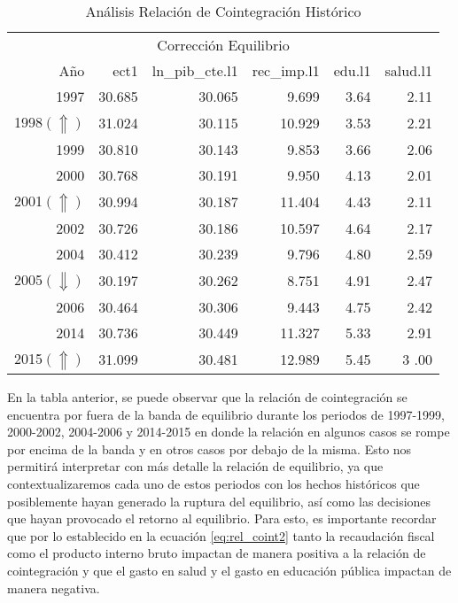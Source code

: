 	
\begin{table}[H]
\begin{center}
    \begin{tabular}{rrrrrr}
    \hline
    \multicolumn{6}{c}{Corrección Equilibrio} \\
        \cline{1-6}
        	Año					&ect1              &ln\_pib\_cte.l1		&rec\_imp.l1		&edu.l1          &salud.l1 		\\
        \hline
        1997					&30.685		&30.065			&9.699			&3.64          &2.11 			\\
        1998$(\Uparrow)$		&31.024		&30.115                    &10.929			&3.53          &2.21 			\\
        1999					&30.810		&30.143                    &9.853			&3.66          &2.06			\\
        \hline \hline
        2000					&30.768		&30.191                    &9.950			&4.13          &2.01			\\
        2001$(\Uparrow)$		&30.994		&30.187                    &11.404			&4.43          &2.11			\\
        2002					&30.726		&30.186                    &10.597			&4.64          &2.17			\\
        \hline \hline
        2004					&30.412		&30.239                    &9.796			&4.80          &2.59			\\
        2005$(\Downarrow)$		&30.197		&30.262                    &8.751			&4.91          &2.47			\\
        2006					&30.464		&30.306                    &9.443			&4.75          &2.42			\\
        \hline \hline
        2014					&30.736		&30.449			&11.327			&5.33	&2.91			\\
        2015$(\Uparrow)$		&31.099		&30.481                    &12.989			&5.45	&3 .00			\\
        \hline
    \end{tabular}
\end{center}
\caption {Análisis Relación de Cointegración Histórico} \label{tab:analisis_ect1} 
\end{table}							



En la tabla anterior, se puede observar que la relación de cointegración se encuentra por fuera de la banda de equilibrio durante los periodos de 1997-1999, 2000-2002, 2004-2006 y 2014-2015 en donde la relación en algunos casos se rompe por encima de la banda y en otros casos por debajo de la misma. Esto nos permitirá interpretar con más detalle la relación de equilibrio, ya que contextualizaremos cada uno de estos periodos con los hechos históricos que posiblemente hayan generado la ruptura del equilibrio, así como las decisiones que hayan provocado el retorno al equilibrio. Para esto, es importante recordar que  por lo establecido en la ecuación  \ref{eq:rel_coint2}  tanto la recaudación fiscal como el producto interno bruto impactan de manera positiva a la relación de cointegración y que el gasto en salud y el gasto en educación pública impactan de manera negativa.\bigskip

